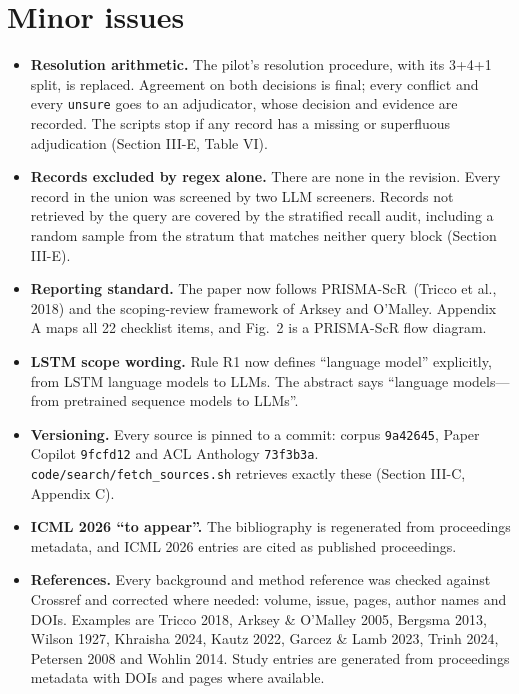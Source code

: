 \documentclass[10pt,a4paper]{article}
\begin{document}
\section*{Minor issues}
\begin{itemize}
  \item \textbf{Resolution arithmetic.} The pilot's resolution procedure, with its 3+4+1 split, is replaced. Agreement on both decisions is final; every conflict and every \texttt{unsure} goes to an adjudicator, whose decision and evidence are recorded. The scripts stop if any record has a missing or superfluous adjudication (Section III-E, Table VI).
  \item \textbf{Records excluded by regex alone.} There are none in the revision. Every record in the union was screened by two LLM screeners. Records not retrieved by the query are covered by the stratified recall audit, including a random sample from the stratum that matches neither query block (Section III-E).
  \item \textbf{Reporting standard.} The paper now follows PRISMA-ScR~(Tricco et al., 2018) and the scoping-review framework of Arksey and O'Malley. Appendix A maps all 22 checklist items, and Fig.~2 is a PRISMA-ScR flow diagram.
  \item \textbf{LSTM scope wording.} Rule R1 now defines ``language model'' explicitly, from LSTM language models to LLMs. The abstract says ``language models---from pretrained sequence models to LLMs''.
  \item \textbf{Versioning.} Every source is pinned to a commit: corpus \texttt{9a42645}, Paper Copilot \texttt{9fcfd12} and ACL Anthology \texttt{73f3b3a}. \texttt{code/search/fetch\_sources.sh} retrieves exactly these (Section III-C, Appendix C).
  \item \textbf{ICML 2026 ``to appear''.} The bibliography is regenerated from proceedings metadata, and ICML 2026 entries are cited as published proceedings.
  \item \textbf{References.} Every background and method reference was checked against Crossref and corrected where needed: volume, issue, pages, author names and DOIs. Examples are Tricco 2018, Arksey \& O'Malley 2005, Bergsma 2013, Wilson 1927, Khraisha 2024, Kautz 2022, Garcez \& Lamb 2023, Trinh 2024, Petersen 2008 and Wohlin 2014. Study entries are generated from proceedings metadata with DOIs and pages where available.
\end{itemize}
\end{document}
